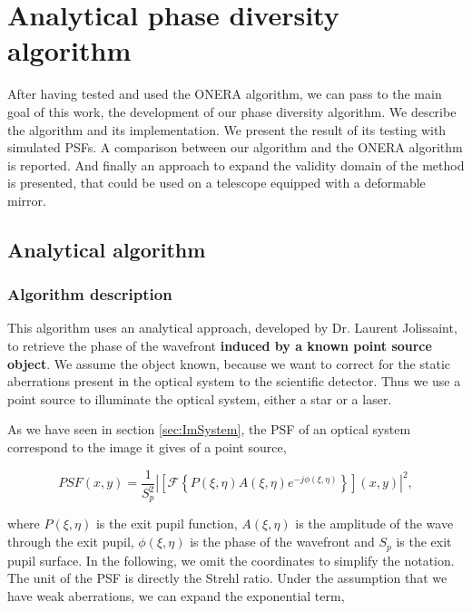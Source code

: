 \chapter{Analytical phase diversity algorithm} 
\label{ch:ourPD}

After having tested and used the ONERA algorithm, we can pass to the main goal of this work, the development of our phase diversity algorithm. We  describe the algorithm and its implementation. We present the result of its testing with simulated PSFs. A comparison between our algorithm and the ONERA algorithm is reported. And finally an approach to expand the validity domain of the method is presented, that could be used on a telescope equipped with a deformable mirror.

\section{Analytical algorithm}
\label{sec:AnAlgo}

\subsection{Algorithm description}
\label{subsec:ANalgoDesc}

This algorithm uses an analytical approach, developed by Dr. Laurent Jolissaint, to retrieve the phase of the wavefront \textbf{induced by a known point source object}. We assume the object known, because we want to correct for the static aberrations present in the optical system to the scientific detector. Thus we use a point source to illuminate the optical system, either a star or a laser.

As we have seen in section \ref{sec:ImSystem}, the PSF of an optical system correspond to the image it gives of a point source,

\begin{equation}
PSF(x,y) = \frac{1}{S_p^2}|\left[\mathcal{F}\left\lbrace P(\xi,\eta)A(\xi,\eta)e^{-j\phi(\xi,\eta)} \right\rbrace\right](x,y)|^2,
\label{eqt:PSF}
\end{equation}

where $P(\xi,\eta)$ is the exit pupil function, $A(\xi,\eta)$ is the amplitude of the wave through the exit pupil, $\phi(\xi,\eta)$ is the phase of the wavefront and $S_p$ is the exit pupil surface. In the following, we omit the coordinates to simplify the notation. The unit of the PSF is directly the Strehl ratio. Under the assumption that we have weak aberrations, we can expand the exponential term,

